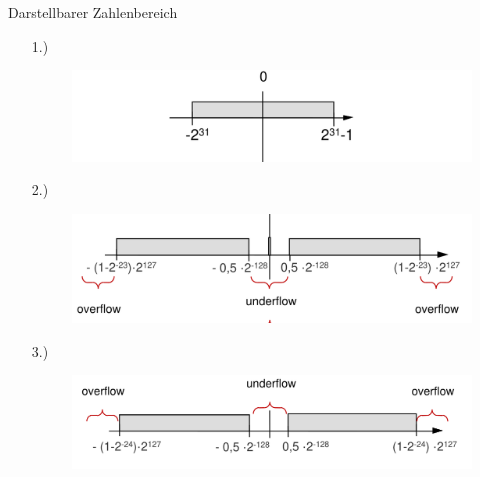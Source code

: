 \documentclass[12pt%
,aspectratio=169%
]{beamer}
\begin{document}
\begin{frame}{Darstellbarer Zahlenbereich}
\begin{itemize}
	\item[1.)]~\\
	\begin{figure}
		\hspace*{0.21cm}
		\includegraphics[scale=0.25]{pictures/f1}
	\end{figure}
	\item[2.)]~\\
	\vspace*{-1cm}
	\begin{figure}
		\includegraphics[scale=0.25]{pictures/f2}
	\end{figure}
	\item[3.)]~\\
	\vspace*{-1cm}
	\begin{figure}
		\includegraphics[scale=0.25]{pictures/f3}
	\end{figure}
\end{itemize}
\end{frame}
\end{document}
